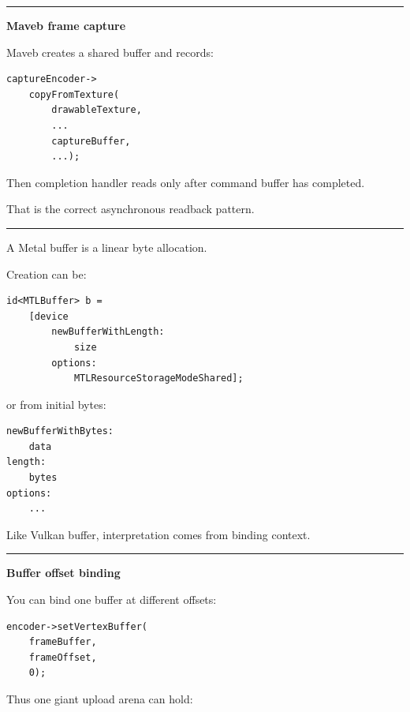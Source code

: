 \begin{center}\rule{0.5\linewidth}{0.5pt}\end{center}

\textbf{Maveb frame capture}

Maveb creates a shared buffer and records:

\begin{verbatim}
captureEncoder->
    copyFromTexture(
        drawableTexture,
        ...
        captureBuffer,
        ...);
\end{verbatim}

Then completion handler reads  only after command buffer has completed.

That is the correct asynchronous readback pattern.

\begin{center}\rule{0.5\linewidth}{0.5pt}\end{center}

\textbf{}

A Metal buffer is a linear byte allocation.

Creation can be:

\begin{verbatim}
id<MTLBuffer> b =
    [device
        newBufferWithLength:
            size
        options:
            MTLResourceStorageModeShared];
\end{verbatim}

or from initial bytes:

\begin{verbatim}
newBufferWithBytes:
    data
length:
    bytes
options:
    ...
\end{verbatim}

Like Vulkan buffer, interpretation comes from binding context.

\begin{center}\rule{0.5\linewidth}{0.5pt}\end{center}

\textbf{Buffer offset binding}

You can bind one buffer at different offsets:

\begin{verbatim}
encoder->setVertexBuffer(
    frameBuffer,
    frameOffset,
    0);
\end{verbatim}

Thus one giant upload arena can hold:

